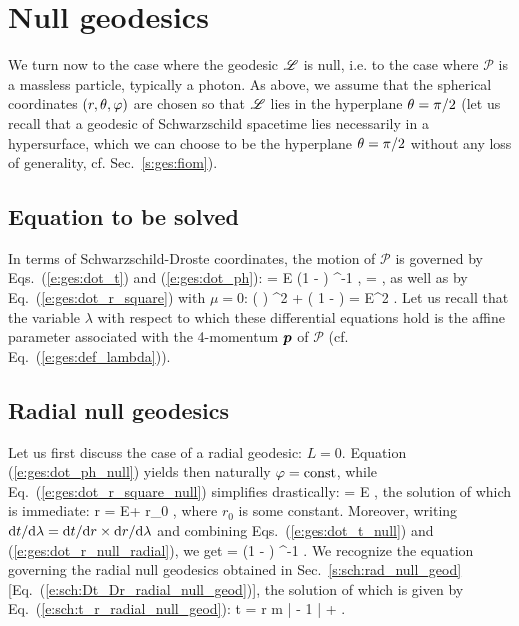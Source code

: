 \section{Null geodesics} \label{s:ges:null}


We turn now to the case where the geodesic $\mathscr{L}$ is null, i.e. to the case
where $\mathscr{P}$ is a massless particle, typically a photon.
As above, we assume that the spherical coordinates $(r,\theta,\varphi)$ are chosen
so that $\mathscr{L}$ lies in the hyperplane $\theta=\pi/2$ (let us recall that
a geodesic of Schwarzschild spacetime lies necessarily in a hypersurface, which
we can choose to be the hyperplane $\theta=\pi/2$ without any loss of generality,
cf. Sec.~\ref{s:ges:fiom}).

\subsection{Equation to be solved}

In terms of Schwarzschild-Droste coordinates, the motion of $\mathscr{P}$ is governed by Eqs.~(\ref{e:ges:dot_t}) and
(\ref{e:ges:dot_ph}):
\be \label{e:ges:dot_t_null}
    = E \left(1 -  \right) ^{-1} ,
\ee
\be \label{e:ges:dot_ph_null}
    \frac{\D\ph}{\D\lambda} =   ,
\ee
as well as by Eq.~(\ref{e:ges:dot_r_square}) with $\mu=0$:
\be \label{e:ges:dot_r_square_null}
    \left(  \right) ^2
         + 
         \left( 1 -  \right) = E^2 .
\ee
Let us recall that the variable $\lambda$ with respect to which these differential equations
hold
is the affine parameter associated with the 4-momentum $\bm{p}$ of $\mathscr{P}$
(cf. Eq.~(\ref{e:ges:def_lambda})).

\subsection{Radial null geodesics}

Let us first discuss the case of a radial geodesic: $L=0$.
Equation (\ref{e:ges:dot_ph_null}) yields then naturally $\varphi=\mathrm{const}$,
while Eq.~(\ref{e:ges:dot_r_square_null}) simplifies drastically:
\be \label{e:ges:dot_r_null_radial}
     = \pm E ,
\ee
the solution of which is immediate:
\be \label{e:ges:r_lambda_radial_null}
    r = \pm E\lambda + r_0 ,
\ee
where $r_0$ is some constant.
Moreover, writing $\mathrm{d} t/\mathrm{d}\lambda = \mathrm{d} t/\mathrm{d} r \times \mathrm{d} r/\mathrm{d}\lambda$
and combining Eqs.~(\ref{e:ges:dot_t_null}) and (\ref{e:ges:dot_r_null_radial}),
we get
\be
     = \pm \left(1 -  \right) ^{-1} .
\ee
We recognize the equation governing the radial null geodesics obtained in
Sec.~\ref{s:sch:rad_null_geod} [Eq.~(\ref{e:sch:Dt_Dr_radial_null_geod})],
the solution of which is given by Eq.~(\ref{e:sch:t_r_radial_null_geod}):
\be
    t = \pm r  m \ln \left|  - 1 \right| +  .
\ee

